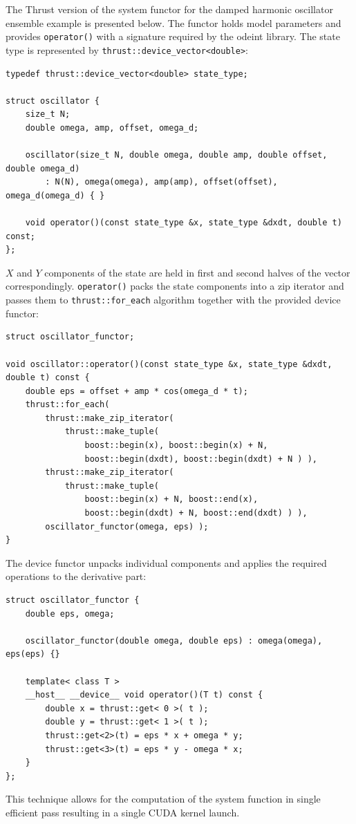 \documentclass[1p]{elsarticle}
\newcommand{\code}[1]{\lstinline|#1|}
\begin{document}
The Thrust version of the system functor for the damped harmonic oscillator
ensemble example is presented below. The functor holds model parameters and
provides \code{operator()} with a signature required by the odeint library. The
state type is represented by \code{thrust::device_vector<double>}:
\begin{lstlisting}
typedef thrust::device_vector<double> state_type;

struct oscillator {
    size_t N;
    double omega, amp, offset, omega_d;

    oscillator(size_t N, double omega, double amp, double offset, double omega_d)
        : N(N), omega(omega), amp(amp), offset(offset), omega_d(omega_d) { }

    void operator()(const state_type &x, state_type &dxdt, double t) const;
};
\end{lstlisting}
$X$ and $Y$ components of the state are held in first and second halves of the
vector correspondingly.  \code{operator()} packs the state components into a
zip iterator and passes them to \code{thrust::for_each} algorithm together with
the provided device functor:
\begin{lstlisting}[firstnumber=12]
struct oscillator_functor;

void oscillator::operator()(const state_type &x, state_type &dxdt, double t) const {
    double eps = offset + amp * cos(omega_d * t);
    thrust::for_each(
        thrust::make_zip_iterator(
            thrust::make_tuple(
                boost::begin(x), boost::begin(x) + N,
                boost::begin(dxdt), boost::begin(dxdt) + N ) ),
        thrust::make_zip_iterator(
            thrust::make_tuple(
                boost::begin(x) + N, boost::end(x),
                boost::begin(dxdt) + N, boost::end(dxdt) ) ),
        oscillator_functor(omega, eps) );
}
\end{lstlisting}
The device functor unpacks individual components and applies the required
operations to the derivative part:
\begin{lstlisting}[firstnumber=last]
struct oscillator_functor {
    double eps, omega;

    oscillator_functor(double omega, double eps) : omega(omega), eps(eps) {}

    template< class T >
    __host__ __device__ void operator()(T t) const {
        double x = thrust::get< 0 >( t );
        double y = thrust::get< 1 >( t );
        thrust::get<2>(t) = eps * x + omega * y;
        thrust::get<3>(t) = eps * y - omega * x;
    }
};
\end{lstlisting}
This technique allows for the computation of the system function in single
efficient pass resulting in a single CUDA kernel launch.
\end{document}
